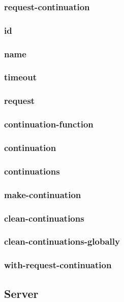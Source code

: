 \subsubsection{request-continuation}
\subsubsection{id}
\subsubsection{name}
\subsubsection{timeout}
\subsubsection{request}
\subsubsection{continuation-function}
\subsubsection{continuation}
\subsubsection{continuations}
\subsubsection{make-continuation}
\subsubsection{clean-continuations}
\subsubsection{clean-continuations-globally}
\subsubsection{with-request-continuation}
\newpage
\subsection{Server}\label{sec:lib server}

